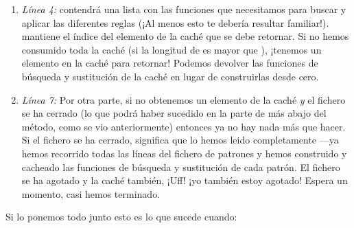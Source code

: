 \begin{enumerate}

\item \emph{Línea 4:}  contendrá una lista con las funciones que necesitamos para buscar y aplicar las diferentes reglas (¡Al menos esto te debería resultar familiar!).  mantiene el índice del elemento de la caché que se debe retornar. Si no hemos consumido toda la caché (si la longitud de  es mayor que ), ¡tenemos un elemento en la caché para retornar! Podemos devolver las funciones de búsqueda y sustitución de la caché en lugar de construirlas desde cero.
 
\item \emph{Línea 7:} Por otra parte, si no obtenemos un elemento de la caché \emph{y} el fichero se ha cerrado (lo que podrá haber sucedido en la parte de más abajo del método, como se vio anteriormente) entonces ya no hay nada más que hacer. Si el fichero se ha cerrado, significa que lo hemos leido completamente ---ya hemos recorrido todas las líneas del fichero de patrones y hemos construido y cacheado las funciones de búsqueda y sustitución de cada patrón. El fichero se ha agotado y la caché también, ¡Uff! ¡yo también estoy agotado! Espera un momento, casi hemos terminado.

\end{enumerate}

Si lo ponemos todo junto esto es lo que sucede cuando:

